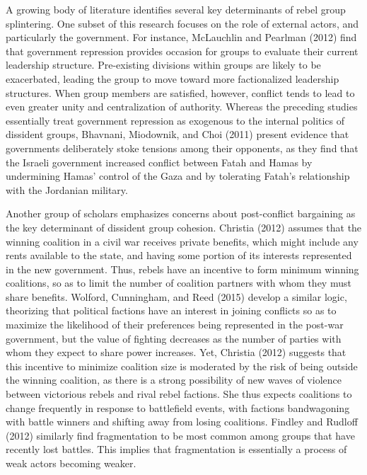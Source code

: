 \documentclass[12pt,]{article}
\begin{document}
A growing body of literature identifies several key determinants of
rebel group splintering. One subset of this research focuses on the role
of external actors, and particularly the government. For instance,
McLauchlin and Pearlman (2012) find that government repression provides
occasion for groups to evaluate their current leadership structure.
Pre-existing divisions within groups are likely to be exacerbated,
leading the group to move toward more factionalized leadership
structures. When group members are satisfied, however, conflict tends to
lead to even greater unity and centralization of authority. Whereas the
preceding studies essentially treat government repression as exogenous
to the internal politics of dissident groups, Bhavnani, Miodownik, and
Choi (2011) present evidence that governments deliberately stoke
tensions among their opponents, as they find that the Israeli government
increased conflict between Fatah and Hamas by undermining Hamas' control
of the Gaza and by tolerating Fatah's relationship with the Jordanian
military.

Another group of scholars emphasizes concerns about post-conflict
bargaining as the key determinant of dissident group cohesion. Christia
(2012) assumes that the winning coalition in a civil war receives
private benefits, which might include any rents available to the state,
and having some portion of its interests represented in the new
government. Thus, rebels have an incentive to form minimum winning
coalitions, so as to limit the number of coalition partners with whom
they must share benefits. Wolford, Cunningham, and Reed (2015) develop a
similar logic, theorizing that political factions have an interest in
joining conflicts so as to maximize the likelihood of their preferences
being represented in the post-war government, but the value of fighting
decreases as the number of parties with whom they expect to share power
increases. Yet, Christia (2012) suggests that this incentive to minimize
coalition size is moderated by the risk of being outside the winning
coalition, as there is a strong possibility of new waves of violence
between victorious rebels and rival rebel factions. She thus expects
coalitions to change frequently in response to battlefield events, with
factions bandwagoning with battle winners and shifting away from losing
coalitions. Findley and Rudloff (2012) similarly find fragmentation to
be most common among groups that have recently lost battles. This
implies that fragmentation is essentially a process of weak actors
becoming weaker.
\end{document}
